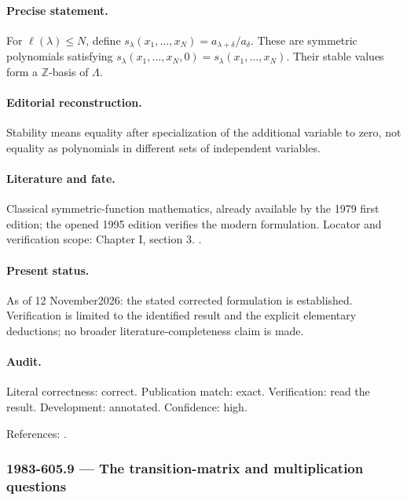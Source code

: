 \paragraph{Precise statement.} For \(\ell(\lambda)\le N\), define \(s_\lambda(x_1,\ldots,x_N)=a_{\lambda+\delta}/a_\delta\). These are symmetric polynomials satisfying \(s_\lambda(x_1,\ldots,x_N,0)=s_\lambda(x_1,\ldots,x_N)\). Their stable values form a \(\mathbb Z\)-basis of \(\Lambda\).

\paragraph{Editorial reconstruction.} Stability means equality after specialization of the additional variable to zero, not equality as polynomials in different sets of independent variables.

\paragraph{Literature and fate.} Classical symmetric-function mathematics, already available by the 1979 first edition; the opened 1995 edition verifies the modern formulation. Locator and verification scope: Chapter I, section 3. \cite{macdonald1995symmetric}.

\paragraph{Present status.} As of 12 November2026: the stated corrected formulation is established. Verification is limited to the identified result and the explicit elementary deductions; no broader literature-completeness claim is made.

\paragraph{Audit.} Literal correctness: correct. Publication match: exact. Verification: read the result. Development: annotated. Confidence: high.

\noindent References: \citep{macdonald1995symmetric}.\par

\subsubsection{1983-605.9 --- The transition-matrix and multiplication questions}

\label{item:1983-605.9}

